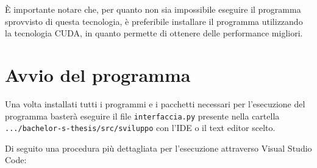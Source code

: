 È importante notare che, per quanto non sia impossibile eseguire il programma sprovvisto di questa tecnologia, è preferibile installare il programma utilizzando la tecnologia CUDA, in quanto permette di ottenere delle performance migliori.

\section{Avvio del programma}
Una volta installati tutti i programmi e i pacchetti necessari per l’esecuzione del programma basterà eseguire il file \texttt{interfaccia.py} presente nella cartella \texttt{.../bachelor-s-thesis/src/sviluppo} con l’IDE o il text editor scelto.

Di seguito una procedura più dettagliata per l’esecuzione attraverso Visual Studio Code:
